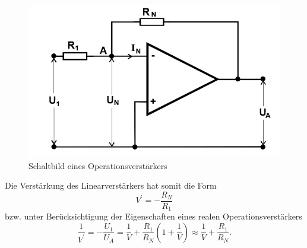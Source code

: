 \begin{figure}
	\centering
	\includegraphics[width=\textwidth]{img/linear.png}
	\caption{Schaltbild eines Operationsverstärkers \cite{FP}}
	\label{abb:linear}
\end{figure}

Die Verstärkung des Linearverstärkers hat somit die Form
\begin{equation}
V^\prime = - \frac{R_N}{R_1}
\end{equation}
bzw. unter Berücksichtigung der Eigenschaften eines realen Operationsverstärkers
\begin{equation}
\frac{1}{V^\prime} = - \frac{U_1}{U_A} = \frac{1}{V} + \frac{R_1}{R_N} \left( 1 + \frac{1}{V} \right) \approx \frac{1}{V} + \frac{R_1}{R_N}.
\label{effVerstaerkung}
\end{equation}


